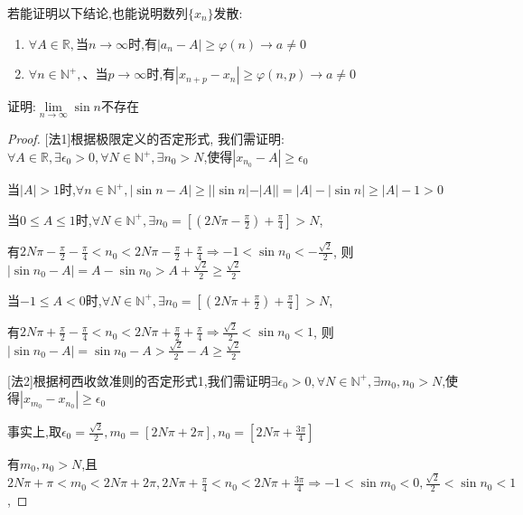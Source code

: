 \begin{note}若能证明以下结论,也能说明数列$\{x_n\}$发散:
    \begin{enumerate}
        \item $\forall A\in \mathbb{R},\mbox{当} n\to \infty \mbox{时,有}|a_n-A| \ge \varphi (n) \to a \ne 0$
        \item $\forall n\in \mathbb{N}^+,、\mbox{当}p\to \infty \mbox{时,有} |x_{n+p}-x_n| \ge \varphi(n,p) \to a \ne 0$
    \end{enumerate}
\end{note}

\begin{example}
    证明:$\lim \limits_{n \to \infty} \sin n$不存在
\end{example}

\begin{proof}

    [法1]根据极限定义的否定形式, 我们需证明:$ \forall A \in \mathbb{R}, \exists \epsilon_0 > 0,\forall N\in \mathbb{N}^+,\exists n_0 > N$,使得$|x_{n_0}-A|\ge \epsilon_0$

    当$|A|>1$时,$\forall n\in \mathbb{N}^+,|\sin n - A| \ge ||\sin n|-|A||=|A|-|\sin n|\ge |A|-1>0$

    当$0\le A \le 1$时,$\forall N\in \mathbb{N}^+,\exists n_0=[(2N\pi - \frac{\pi}{2})+\frac{\pi}{4}]>N$,

    有$2N\pi - \frac{\pi}{2}-\frac{\pi}{4} < n_0 < 2N\pi -\frac{\pi}{2}+\frac{\pi}{4} \Longrightarrow -1 < \sin n_0 < -\frac{\sqrt{2}}{2}$,
    则$|\sin n_0 -A|=A-\sin n_0 > A+\frac{\sqrt{2}}{2}\ge \frac{\sqrt{2}}{2}$

    当$-1\le A<0$时,$\forall N\in \mathbb{N}^+,\exists n_0=[(2N\pi + \frac{\pi}{2})+\frac{\pi}{4}]>N$,

    有$2N\pi + \frac{\pi}{2}-\frac{\pi}{4} < n_0 < 2N\pi +\frac{\pi}{2}+\frac{\pi}{4} \Longrightarrow \frac{\sqrt{2}}{2} < \sin n_0 < 1 $,
    则$|\sin n_0 -A|=\sin n_0 - A > \frac{\sqrt{2}}{2} - A \ge \frac{\sqrt{2}}{2}$

    [法2]根据柯西收敛准则的否定形式1,我们需证明$\exists \epsilon_0 > 0,\forall N\in \mathbb{N}^+,\exists m_0,n_0 > N$,使得$|x_{m_0}-x_{n_0}|\ge \epsilon_0 $

    事实上,取$\epsilon_0=\frac{\sqrt{2}}{2},m_0=[2N\pi + 2\pi] ,n_0=[2N\pi + \frac{3\pi}{4}]$

    有$m_0,n_0>N$,且$2N\pi + \pi <m_0< 2N\pi + 2\pi,2N\pi +\frac{\pi}{4}<n_0<2N\pi + \frac{3\pi}{4}\Longrightarrow -1<\sin m_0<0,\frac{\sqrt{2}}{2}<\sin n_0<1$,


\end{proof}
